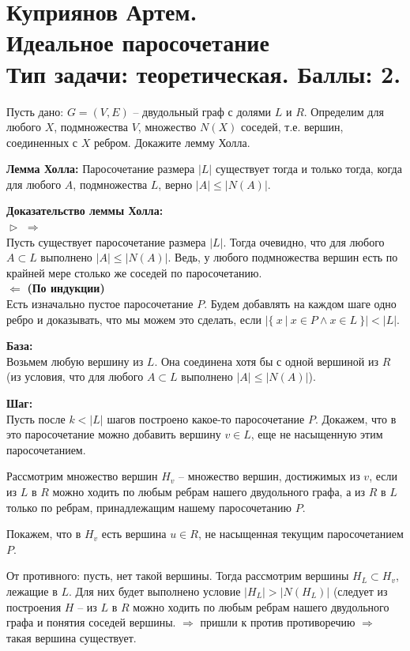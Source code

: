 \documentclass[a4paper,12pt]{paper} %
\begin{document}
\section{Куприянов Артем. \\ Идеальное паросочетание \\ Тип задачи: теоретическая.
Баллы: 2.} 

Пусть дано: $G = (V, E)$ -- двудольный граф с долями $L$ и $R$. Определим для любого $X$, подмножества $V$, множество $N(X)$ соседей, т.е. вершин, соединенных с $X$ ребром. Докажите лемму Холла. 

\textbf{Лемма Холла: } Паросочетание размера $\vert L \vert$ существует тогда и только тогда, когда для любого $A$, подмножества $L$, верно $\vert A \vert \leq \vert N(A) \vert$.

\textbf{Доказательство леммы Холла:} \\
$\vartriangleright$  
$\Rightarrow$ \\ Пусть существует паросочетание размера $\vert L \vert$. Тогда очевидно, что для любого $A \subset L$ выполнено $\vert A \vert \leq \vert N(A) \vert$. Ведь, у любого подмножества вершин есть по крайней мере столько же соседей по паросочетанию. 
\\ $\Leftarrow$ \textbf{(По индукции) } \\
Есть изначально пустое паросочетание $P$. Будем добавлять на каждом шаге одно ребро и доказывать, что мы можем это сделать, если $\vert \{ \ x \  \vert \  x \in P \wedge x \in L \  \} \vert < \vert L \vert$.

\textbf{База: } \\ Возьмем любую вершину из $L$. Она соединена хотя бы с одной вершиной из $R$ (из условия, что для любого $A \subset L$ выполнено $\vert A \vert \leq \vert N(A) \vert$).

\textbf{Шаг: } \\
Пусть после  $k < \vert L \vert$ шагов построено какое-то паросочетание $P$. Докажем, что в это паросочетание можно добавить вершину  $v \in L$, еще не насыщенную этим паросочетанием.
 
Рассмотрим множество вершин $H_v$ -- множество вершин, достижимых из $v$, если из $L$ в $R$ можно ходить по любым ребрам нашего двудольного графа, а из $R$ в $L$ только по ребрам, принадлежащим нашему паросочетанию $P$.

Покажем, что в $H_v$  есть вершина $u \in R$, не насыщенная текущим паросочетанием $P$. 

От противного: пусть, нет такой вершины. Тогда рассмотрим вершины $H_L \subset H_v$, лежащие в $L$. Для них будет выполнено условие $\vert H_L \vert > \vert N(H_L) \vert$ (следует из построения $H$  -- из $L$ в $R$ можно ходить по любым ребрам нашего двудольного графа и понятия соседей вершины. $\Rightarrow$ пришли к против противоречию $\Rightarrow$ такая вершина существует.
\end{document}
